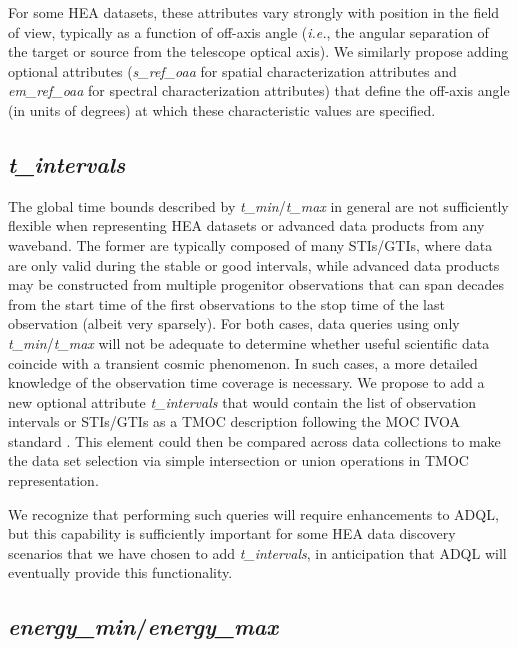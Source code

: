 \documentclass[11pt,a4paper]{ivoa}
\begin{document}
For some \gls{HEA} datasets, these attributes vary strongly with position in the field of view, typically as a function of off-axis angle ({\em i.e.\/}, the angular separation of the target or source from the telescope optical axis). We similarly propose adding optional attributes ({\em s\_ref\_oaa\/} for spatial characterization attributes and {\em em\_ref\_oaa\/} for spectral characterization attributes) that define the off-axis angle (in units of degrees) at which these characteristic values are specified.

\subsection{{\em t\_intervals}}

The global time bounds described by {\em t\_min\/}/{\em t\_max\/} in general are not sufficiently flexible when representing \gls{HEA} datasets or advanced data products from any waveband.  The former are typically composed of many \glspl{STI}/\glspl{GTI}, where data are only valid during the stable or good intervals, while advanced data products may be constructed from multiple progenitor observations that can span decades from the start time of the first observations to the stop time of the last observation (albeit very sparsely).  For both cases, data queries using only {\em t\_min\/}/{\em t\_max\/} will not be adequate to determine whether useful scientific data coincide with a transient cosmic phenomenon.  In such cases, a more detailed knowledge of the observation time coverage is necessary.  We propose to add a new optional attribute {\em t\_intervals\/} that would contain the list of observation intervals or \glspl{STI}/\glspl{GTI} as a TMOC description following the \gls{MOC} IVOA standard  \citep{2022ivoa.spec.0727F}. This element could then be compared across data collections to make the data set selection via simple intersection or union operations in TMOC representation.

We recognize that performing such queries will require enhancements to ADQL, but this capability is sufficiently important for some \gls{HEA} data discovery scenarios that we have chosen to add {\em t\_intervals\/}, in anticipation that ADQL will eventually provide this functionality.

\subsection{{\em energy\_min\/}/{\em energy\_max\/}}
\end{document}
